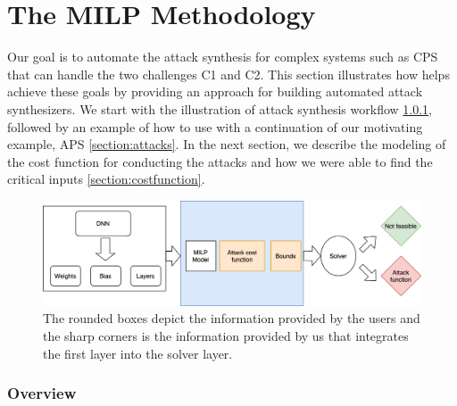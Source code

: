 	\chapter{The MILP Methodology}

Our goal is to automate the attack synthesis for complex systems such as CPS that can handle the two challenges C1 and C2. This section illustrates how \tool helps achieve these goals by providing an approach for building automated attack synthesizers. We start with the illustration of attack synthesis workflow \ref{section:overview}, followed by an example of how to use \tool with a continuation of our motivating example, APS \ref{section:attacks}. In the next section, we describe the modeling of the cost function for conducting the attacks and how we were able to find the critical inputs \ref{section:costfunction}. %

\begin{figure}
	\centering
	\includegraphics[scale=0.1]{"Images/Methodology"}
	\caption[Methodology]{The rounded boxes depict the information provided by the users and the sharp corners is the information provided by us that integrates the first layer into the solver layer.}
	\label{fig:methodology-2}
\end{figure}



\subsection{Overview}
\label{section:overview}

